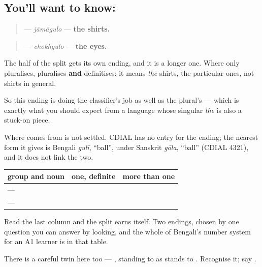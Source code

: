 \subsection*{You'll want to know: }
\begin{quote}
\textbf{} — \emph{jāmāgulo} — \textbf{the shirts.}
\end{quote}

\begin{quote}
\textbf{} — \emph{chokhgulo} — \textbf{the eyes.}
\end{quote}

The \textbf{} half of the split gets its own ending, and it is a longer one. Where \textbf{} only pluralises, \textbf{} pluralises \textbf{and} definitises: it means \emph{the} shirts, the particular ones, not shirts in general.

So this ending is doing the classifier's job as well as the plural's — which is exactly what you should expect from a language whose singular \emph{the} is also a stuck-on piece.

\begin{cousinweb}
Where \textbf{} comes from is not settled. CDIAL has no entry for the ending; the nearest form it gives is Bengali \emph{gulī}, \textquotedblleft{}ball\textquotedblright{}, under Sanskrit \emph{gōla}, \textquotedblleft{}ball\textquotedblright{} (CDIAL 4321), and it does not link the two.
\end{cousinweb}

\begin{grammarlens}[title={Grammar Lens: the full table, finally}]
\noindent
\begin{tabularx}{\linewidth}{@{}>{\raggedright\arraybackslash}X>{\raggedright\arraybackslash}X>{\raggedright\arraybackslash}X@{}}
\toprule
\textbf{group and noun} & \textbf{one, definite} & \textbf{more than one} \\
\midrule
\textbf{\bn{জীব}} — \textbf{\bn{ভাই}} & \bn{ভাইটি} & \textbf{\bn{ভাইরা}} \\
\textbf{\bn{জিনিস}} — \textbf{\bn{জামা}} & \bn{জামাটা} & \textbf{\bn{জামাগুলো}} \\
\bottomrule
\end{tabularx}

Read the last column and the split earns itself. Two endings, chosen by one question you can answer by looking, and the whole of Bengali's number system for an A1 learner is in that table.

There is a careful twin here too — \textbf{}, standing to \textbf{} as \textbf{} stands to \textbf{}. Recognise it; say \textbf{}.
\end{grammarlens}


